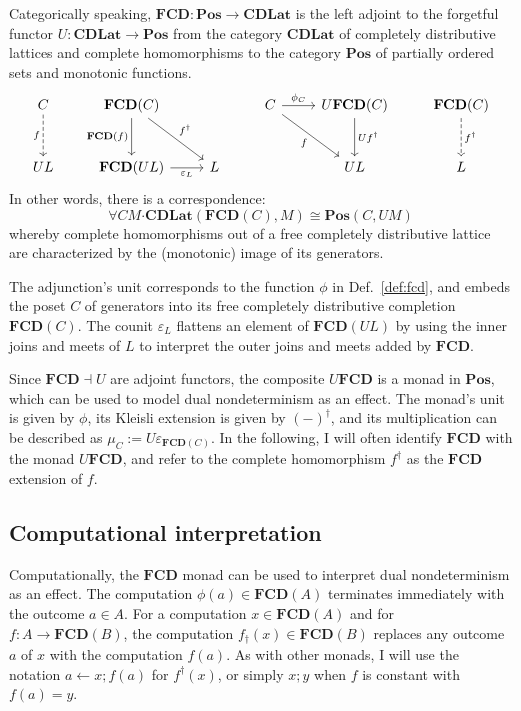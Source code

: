\documentclass[11pt,oneside,draft]{book}
\theoremstyle{definition}
\newcommand{\bdot}{\boldsymbol{\cdot}}
\begin{document}
Categorically speaking,
$\mathbf{FCD} : \mathbf{Pos} \rightarrow \mathbf{CDLat}$
is the left adjoint to the forgetful functor
$U : \mathbf{CDLat} \rightarrow \mathbf{Pos}$
from the category $\mathbf{CDLat}$
of completely distributive lattices and complete homomorphisms
to the category $\mathbf{Pos}$
of partially ordered sets and monotonic functions.
\[
  \begin{tikzcd}[row sep=large]
    C \ar[d, "f"', dashed] &
    \mathbf{FCD}(C) \ar[d, "\mathbf{FCD}(f)"'] \ar[dr, "f^\dagger"] &
    &
    C \ar[r, "\phi_C"] \ar[dr, "f"'] &
    U \mathbf{FCD}(C) \ar[d, "U f^\dagger"] &
    \mathbf{FCD}(C) \ar[d, "f^\dagger", dashed]
    \\
    U L &
    \mathbf{FCD}(U L) \ar[r, "\varepsilon_L"'] &
    L & & U L & L
  \end{tikzcd}
\]
In other words,
there is a correspondence:
\[
  \forall C M \bdot
  \mathbf{CDLat}(\mathbf{FCD}(C), M) \cong
  \mathbf{Pos}(C, U M)
\]
whereby complete homomorphisms out of a
free completely distributive lattice
are characterized by
the (monotonic) image of its generators.

The adjunction's unit corresponds to the function $\phi$
in Def.~\ref{def:fcd},
and embeds the poset $C$ of generators into
its free completely distributive completion $\mathbf{FCD}(C)$.
The counit $\varepsilon_L$ flattens an element of $\mathbf{FCD}(U L)$
by using the inner joins and meets of $L$ to interpret
the outer joins and meets added by $\mathbf{FCD}$.

Since $\mathbf{FCD} \dashv U$ are adjoint functors,
the composite $U \mathbf{FCD}$
is a monad in $\mathbf{Pos}$,
which can be used to model dual nondeterminism
as an effect.
The monad's unit is given by $\phi$,
its Kleisli extension is given by $(-)^\dagger$,
and its multiplication can be described as
$\mu_C := U \varepsilon_{\mathbf{FCD}(C)}$.
In the following,
I will often identify $\mathbf{FCD}$ with
the monad $U \mathbf{FCD}$,
and refer to the complete homomorphism
$f^\dagger$ as the $\mathbf{FCD}$ extension of $f$.


\subsection{Computational interpretation}

Computationally,
the $\mathbf{FCD}$ monad can be used to interpret
dual nondeterminism as an effect.
The computation
$\phi(a) \in \mathbf{FCD}(A)$
terminates immediately with the outcome $a \in A$.
For a computation $x \in \mathbf{FCD}(A)$
and for $f : A \rightarrow \mathbf{FCD}(B)$,
the computation $f_\dagger(x) \in \mathbf{FCD}(B)$
replaces
any outcome $a$ of $x$ with the computation $f(a)$.
As with other monads,
I will use the notation
$a \leftarrow x ; f(a)$ for $f^\dagger(x)$,
or simply $x ; y$ when $f$ is constant with $f(a) = y$.
\end{document}
